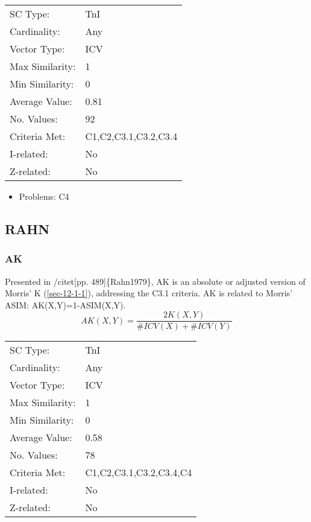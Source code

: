 \documentclass{article}
\begin{document}
\begin{center}
\begin{tabular}{ll}
 SC Type:         &  TnI                   \\
 Cardinality:     &  Any                   \\
 Vector Type:     &  ICV                   \\
 Max Similarity:  &  1                     \\
 Min Similarity:  &  0                     \\
 Average Value:   &  0.81                  \\
 No. Values:      &  92                    \\
 Criteria Met:    &  C1,C2,C3.1,C3.2,C3.4  \\
 I-related:       &  No                    \\
 Z-related:       &  No                    \\
\end{tabular}
\end{center}


\begin{itemize}
\item Problems: C4
\end{itemize}
\subsection{RAHN}
\label{sec-12-5}
\subsubsection{AK}
\label{sec-12-5-1}

Presented in /citet[pp. 489]\{Rahn1979\}, AK is an absolute or adjusted
version of Morris' K (\ref{sec-12-1-1}), addressing the C3.1 criteria. AK is related
to Morris' ASIM: AK(X,Y)=1-ASIM(X,Y).
$$AK\left(X,Y\right)=\frac{2K\left(X,Y\right)}{\#ICV\left(X\right)+\#ICV\left(Y\right)}$$

\begin{center}
\begin{tabular}{ll}
 SC Type:         &  TnI                      \\
 Cardinality:     &  Any                      \\
 Vector Type:     &  ICV                      \\
 Max Similarity:  &  1                        \\
 Min Similarity:  &  0                        \\
 Average Value:   &  0.58                     \\
 No. Values:      &  78                       \\
 Criteria Met:    &  C1,C2,C3.1,C3.2,C3.4,C4  \\
 I-related:       &  No                       \\
 Z-related:       &  No                       \\
\end{tabular}
\end{center}
\end{document}
